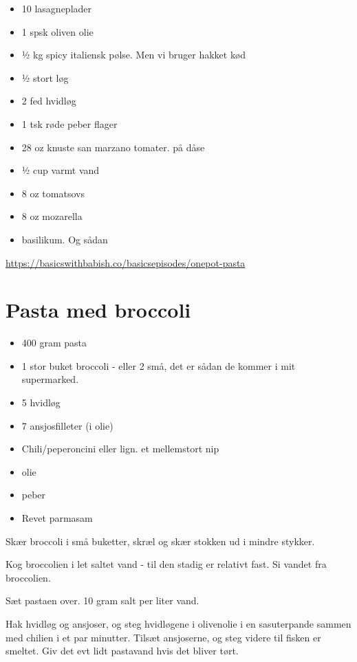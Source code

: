 \documentclass[
]{book}
\providecommand{\tightlist}{%
  \setlength{\itemsep}{0pt}\setlength{\parskip}{0pt}}
\begin{document}
\begin{itemize}
\tightlist
\item
  10 lasagneplader
\item
  1 spsk oliven olie
\item
  ½ kg spicy italiensk pølse. Men vi bruger hakket kød
\item
  ½ stort løg
\item
  2 fed hvidløg
\item
  1 tsk røde peber flager
\item
  28 oz knuste san marzano tomater. på dåse
\item
  ½ cup varmt vand
\item
  8 oz tomatsovs
\item
  8 oz mozarella
\item
  basilikum. Og sådan
\end{itemize}

\url{https://basicswithbabish.co/basicsepisodes/onepot-pasta}

\section{Pasta med broccoli}\label{pasta-med-broccoli}

\begin{itemize}
\tightlist
\item
  400 gram pasta
\item
  1 stor buket broccoli - eller 2 små, det er sådan de kommer i mit supermarked.
\item
  5 hvidløg
\item
  7 ansjosfilleter (i olie)
\item
  Chili/peperoncini eller lign. et mellemstort nip
\item
  olie
\item
  peber
\item
  Revet parmasam
\end{itemize}

Skær broccoli i små buketter, skræl og skær stokken ud i mindre stykker.

Kog broccolien i let saltet vand - til den stadig er relativt fast. Si vandet fra broccolien.

Sæt pastaen over. 10 gram salt per liter vand.

Hak hvidløg og ansjoser, og steg hvidløgene i olivenolie i en sasuterpande sammen med chilien i et par minutter. Tilsæt ansjoserne, og steg videre til fisken er smeltet. Giv det evt lidt pastavand hvis det bliver tørt.
\end{document}
